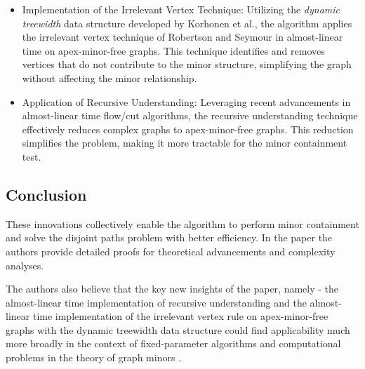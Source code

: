 \begin{itemize}
    \item 
    Implementation of the Irrelevant Vertex Technique: Utilizing the \textit{dynamic treewidth} data structure developed by Korhonen et al., the algorithm applies the irrelevant vertex technique of Robertson and Seymour in almost-linear time on apex-minor-free graphs. This technique identifies and removes vertices that do not contribute to the minor structure, simplifying the graph without affecting the minor relationship.
\item Application of Recursive Understanding: Leveraging recent advancements in almost-linear time flow/cut algorithms, the recursive understanding technique effectively reduces complex graphs to apex-minor-free graphs. This reduction simplifies the problem, making it more tractable for the minor containment test.
\end{itemize}

\subsection{Conclusion}
These innovations collectively enable the algorithm to perform minor containment and solve the disjoint paths problem with better efficiency. In the paper the authors provide detailed proofs for theoretical advancements and complexity analyses.

The authors also believe that the key new insights of the paper, namely - the almost-linear time implementation of recursive understanding and the almost-linear time implementation of the irrelevant vertex rule on apex-minor-free graphs with the dynamic treewidth data structure could find applicability much more broadly in the context of fixed-parameter algorithms and computational problems in the theory of graph minors \cite{10756048}.



